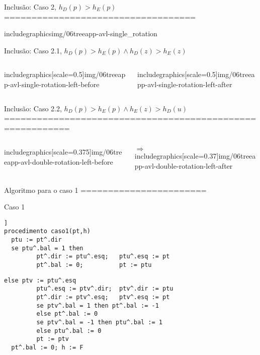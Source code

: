 Inclusão: Caso 2, $h_D(p) > h_E(p)$
===================================

includegraphics{img/06treeapp-avl-single_rotation}

Inclusão: Caso 2.1, $h_D(p) > h_E(p) \land h_D(z) > h_E(z)$

\begin{columns}
\begin{column}{0.5\textwidth}
includegraphics[scale=0.5]{img/06treeapp-avl-single-rotation-left-before}
\end{column}
\begin{column}{0.5\textwidth}
includegraphics[scale=0.5]{img/06treeapp-avl-single-rotation-left-after}
\end{column}
\end{columns}

Inclusão: Caso 2.2, $h_D(p) > h_E(p) \land h_E(z) > h_D(u)$
==========================================================

\begin{columns}
\begin{column}{0.35\textwidth}
includegraphics[scale=0.375]{img/06treeapp-avl-double-rotation-left-before}
\end{column}
\begin{column}{0.65\textwidth}
$\Rightarrow$ includegraphics[scale=0.37]{img/06treeapp-avl-double-rotation-left-after}
\end{column}
\end{columns}

Algoritmo para o caso 1
=======================

\small
\begin{block}{Caso 1}
\begin{lstlisting}[basicstyle=\color<2>{gray}]]
procedimento caso1(pt,h)
  ptu := pt^.dir
  se ptu^.bal = 1 then
         pt^.dir := ptu^.esq;   ptu^.esq := pt
         pt^.bal := 0;          pt := ptu
\end{lstlisting}
\pause
\begin{lstlisting}[firstnumber=6,basicstyle=\color<1>{gray}\color<2>{black}]
  else ptv := ptu^.esq
         ptu^.esq := ptv^.dir;  ptv^.dir := ptu
         pt^.dir := ptv^.esq;   ptv^.esq := pt
         se ptv^.bal = 1 then pt^.bal := -1 
         else pt^.bal := 0
         se ptv^.bal = -1 then ptu^.bal := 1 
         else ptu^.bal := 0
         pt := ptv
  pt^.bal := 0; h := F   
\end{lstlisting}
\end{block}


